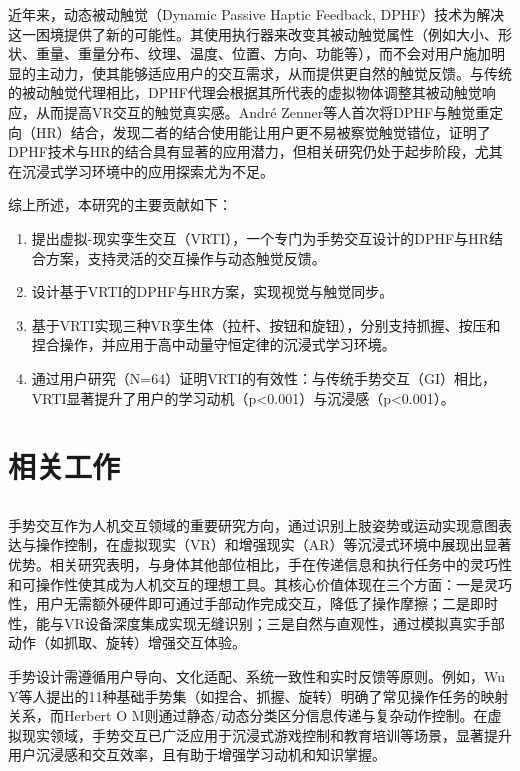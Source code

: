 \documentclass[runningheads]{llncs}
\begin{document}
近年来，动态被动触觉（Dynamic Passive Haptic Feedback, DPHF）技术为解决这一困境提供了新的可能性\cite{zenner2017shifty}。其使用执行器来改变其被动触觉属性（例如大小、形状、重量、重量分布、纹理、温度、位置、方向、功能等），而不会对用户施加明显的主动力，使其能够适应用户的交互需求，从而提供更自然的触觉反馈。与传统的被动触觉代理相比，DPHF代理会根据其所代表的虚拟物体调整其被动触觉响应，从而提高VR交互的触觉真实感。André Zenner等人首次将DPHF与触觉重定向（HR）结合，发现二者的结合使用能让用户更不易被察觉触觉错位，证明了DPHF技术与HR的结合具有显著的应用潜力\cite{zenner2021combining}，但相关研究仍处于起步阶段，尤其在沉浸式学习环境中的应用探索尤为不足。

综上所述，本研究的主要贡献如下：

\begin{enumerate}[label={\arabic*)}]
  \item 提出虚拟-现实孪生交互（VRTI），一个专门为手势交互设计的DPHF与HR结合方案，支持灵活的交互操作与动态触觉反馈。
  \item 设计基于VRTI的DPHF与HR方案，实现视觉与触觉同步。
  \item 基于VRTI实现三种VR孪生体（拉杆、按钮和旋钮），分别支持抓握、按压和捏合操作，并应用于高中动量守恒定律的沉浸式学习环境。
  \item 通过用户研究（N=64）证明VRTI的有效性：与传统手势交互（GI）相比，VRTI显著提升了用户的学习动机（p<0.001）与沉浸感（p<0.001）。
\end{enumerate}

\section{相关工作}
\subsection{} 
手势交互作为人机交互领域的重要研究方向，通过识别上肢姿势或运动实现意图表达与操作控制\cite{yang2019gesture}，在虚拟现实（VR）和增强现实（AR）等沉浸式环境中展现出显著优势\cite{10574578}。相关研究表明，与身体其他部位相比，手在传递信息和执行任务中的灵巧性和可操作性使其成为人机交互的理想工具\cite{karam2006framework}。其核心价值体现在三个方面\cite{mitra2007gesture,10580881,app14114935}：一是灵巧性，用户无需额外硬件即可通过手部动作完成交互，降低了操作摩擦；二是即时性，能与VR设备深度集成实现无缝识别；三是自然与直观性，通过模拟真实手部动作（如抓取、旋转）增强交互体验。

手势设计需遵循用户导向、文化适配、系统一致性和实时反馈等原则\cite{lou2018analysis}。例如，Wu Y等人提出的11种基础手势集（如捏合、抓握、旋转）明确了常见操作任务的映射关系\cite{wu2024empirical}，而Herbert O M则通过静态/动态分类区分信息传递与复杂动作控制\cite{herbert2024static}。在虚拟现实领域，手势交互已广泛应用于沉浸式游戏控制和教育培训等场景\cite{10574578,lu2024chemical}，显著提升用户沉浸感和交互效率\cite{10580881}，且有助于增强学习动机和知识掌握\cite{lu2024chemical}。
\end{document}
